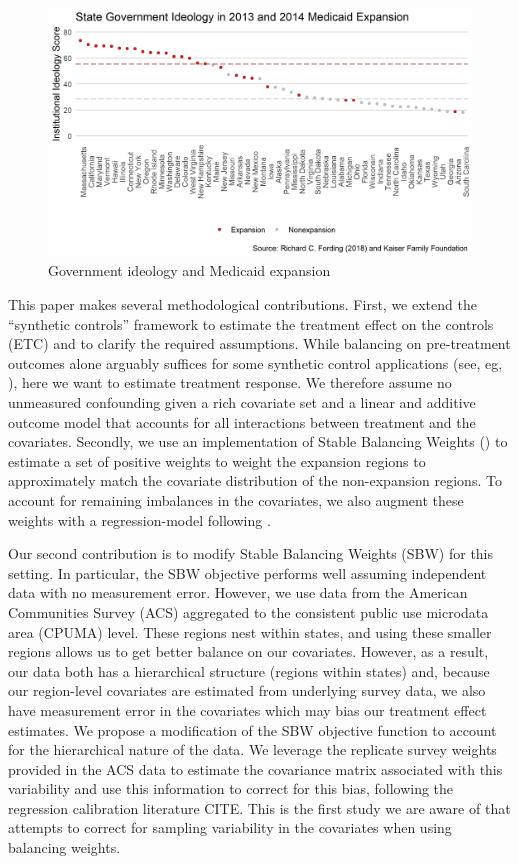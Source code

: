 \documentclass[12pt]{article}
\begin{document}
\begin{figure}
    \begin{center}
    \includegraphics[scale=0.7]{01_Plots/political-expansion-plot.png}
    \caption{Government ideology and Medicaid expansion}
    \label{fig1}
    \end{center}
\end{figure}

This paper makes several methodological contributions. First, we extend the ``synthetic controls'' framework to estimate the treatment effect on the controls (ETC) and to clarify the required assumptions. While balancing on pre-treatment outcomes alone arguably suffices for some synthetic control applications (see, eg, \cite{botosaru2017role}), here we want to estimate treatment response. We therefore assume no unmeasured confounding given a rich covariate set and a linear and additive outcome model that accounts for all interactions between treatment and the covariates. Secondly, we use an implementation of Stable Balancing Weights (\cite{zubizarreta2015stable}) to estimate a set of positive weights to weight the expansion regions to approximately match the covariate distribution of the non-expansion regions. To account for remaining imbalances in the covariates, we also augment these weights with a regression-model following \cite{ben2018augmented}.

Our second contribution is to modify Stable Balancing Weights (SBW) for this setting. In particular, the SBW objective performs well assuming independent data with no measurement error. However, we use data from the American Communities Survey (ACS) aggregated to the consistent public use microdata area (CPUMA) level. These regions nest within states, and using these smaller regions allows us to get better balance on our covariates. However, as a result, our data both has a hierarchical structure (regions within states) and, because our region-level covariates are estimated from underlying survey data, we also have measurement error in the covariates which may bias our treatment effect estimates. We propose a modification of the SBW objective function to account for the hierarchical nature of the data. We leverage the replicate survey weights provided in the ACS data to estimate the covariance matrix associated with this variability and use this information to correct for this bias, following the regression calibration literature CITE. This is the first study we are aware of that attempts to correct for sampling variability in the covariates when using balancing weights. 
\end{document}
